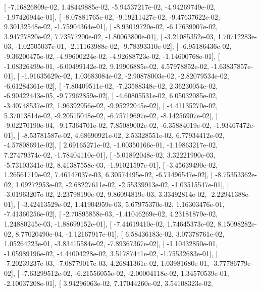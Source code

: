\documentclass{article}
\begin{document}
       [ -7.16826809e-02,   1.48449885e-02,  -5.94537217e-02,
         -4.94269749e-02,  -1.97426944e-01],
       [ -8.07881765e-02,  -9.19211427e-02,  -9.47637622e-02,
          9.30132548e-02,  -1.75904364e-01],
       [ -8.93019720e-02,  -6.17639907e-02,   3.94727820e-02,
          7.73577200e-02,  -1.80063800e-01],
       [ -3.21085352e-03,   1.70712283e-03,  -1.02505037e-01,
         -2.11163988e-02,  -9.78393310e-02],
       [ -6.95186436e-02,  -9.36200475e-02,  -4.99600224e-02,
         -4.92688723e-02,  -1.14600768e-01],
       [ -1.08326499e-01,  -6.00499142e-02,   9.19906885e-02,
          4.57978852e-02,  -1.63837857e-01],
       [ -1.91635629e-02,   1.03683084e-02,  -2.90878003e-02,
         -2.82079534e-02,  -6.61284361e-02],
       [ -7.80409511e-02,  -7.23588348e-02,   2.36230054e-02,
         -6.90422443e-05,  -9.77962859e-02],
       [ -4.60805531e-02,   6.05032085e-02,  -3.40748537e-02,
          1.96392956e-02,  -9.95222045e-02],
       [ -4.41135270e-02,   5.37013814e-02,  -9.20515048e-02,
         -6.75719697e-02,  -8.14256907e-02],
       [ -9.02270190e-04,  -9.17364701e-02,   7.85089002e-02,
         -6.35884019e-02,  -1.93467472e-01],
       [ -8.53781587e-02,   4.68690921e-02,   2.53328551e-02,
          6.77934412e-02,  -4.57808691e-02],
       [  2.69165271e-02,  -1.00350166e-01,  -1.19863217e-02,
          7.27479374e-02,  -1.78404110e-01],
       [ -5.01892048e-02,   3.32221990e-03,  -5.73103341e-02,
          8.41387558e-03,  -1.91021597e-01],
       [ -3.45639490e-02,   1.26561719e-02,   7.46147037e-03,
          6.30574495e-02,  -6.71496547e-02],
       [ -8.75353362e-02,   1.09272953e-02,  -2.68227611e-02,
         -2.55339913e-02,  -1.03515547e-01],
       [ -3.01963207e-02,   2.23798190e-02,   9.86094819e-03,
          3.33492814e-02,  -2.22941388e-01],
       [ -3.42413529e-02,   1.41904959e-03,   5.67975370e-02,
          1.16303476e-01,  -7.41360256e-02],
       [ -2.70895858e-03,  -1.41046269e-02,   4.23181879e-02,
          1.24880245e-03,  -1.88699152e-01],
       [ -7.44619410e-02,   1.74645373e-02,   8.15098282e-02,
          8.77020490e-04,  -1.12167917e-01],
       [  6.58436183e-02,   3.07378761e-02,   1.05264223e-01,
         -3.83415584e-02,  -7.89367367e-02],
       [ -1.10432850e-01,  -1.05989196e-02,  -4.44004228e-02,
          3.51787441e-02,  -1.75532683e-01],
       [ -7.20239237e-03,  -7.08779017e-03,   4.26841361e-02,
          1.03981680e-01,  -3.77786779e-02],
       [ -7.63299512e-02,  -6.21556055e-02,  -2.00004118e-02,
          1.34570539e-01,  -2.10037208e-01],
       [  3.94296063e-02,   7.17044260e-02,   3.54108323e-02,
\end{document}
